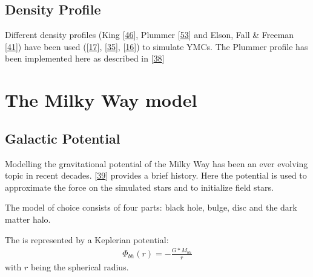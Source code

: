 \documentclass[letterpaper,10pt,english]{sphinxmanual}
\begin{document}
		
		\section{Density Profile}
			\label{\detokenize{NBodySimulation/Initialization:density-profile}}
			\sphinxAtStartPar
			Different density profiles (King {[}\hyperlink{cite.NBodySimulation/Appendix:id40}{46}{]}, Plummer {[}\hyperlink{cite.NBodySimulation/Appendix:id41}{53}{]} and Elson, Fall \& Freeman {[}\hyperlink{cite.NBodySimulation/Appendix:id42}{41}{]}) have been used ({[}\hyperlink{cite.NBodySimulation/Appendix:id36}{17}{]}, {[}\hyperlink{cite.NBodySimulation/Appendix:id37}{35}{]}, {[}\hyperlink{cite.NBodySimulation/Appendix:id38}{16}{]}) to simulate YMCs.
			The Plummer profile has been implemented here as described in {[}\hyperlink{cite.NBodySimulation/Appendix:id39}{38}{]} 


	\chapter{The Milky Way model}

		\section{Galactic Potential}
			\label{\detokenize{NBodySimulation/Potential:galactic-potential}}\label{\detokenize{NBodySimulation/Potential:galactic-potential-label}}\label{\detokenize{NBodySimulation/Potential::doc}}
			\sphinxAtStartPar
			Modelling the gravitational potential of the Milky Way has been an ever evolving topic in recent decades. {[}\hyperlink{cite.NBodySimulation/Appendix:id58}{39}{]} provides a brief history.
			Here the potential is used to approximate the force on the simulated stars and to initialize field stars.
			
			\sphinxAtStartPar
			The model of choice consists of four parts: black hole, bulge, disc and the dark matter halo.
			
			\sphinxAtStartPar
			The  is represented by a Keplerian potential:
			\begin{equation*}
			\begin{split}\Phi_{bh}\left ( r \right ) = -\frac{G*M_{bh}}{r}\end{split}
			\end{equation*}
			\sphinxAtStartPar
			with \(r\) being the spherical radius.
			
\end{document}
